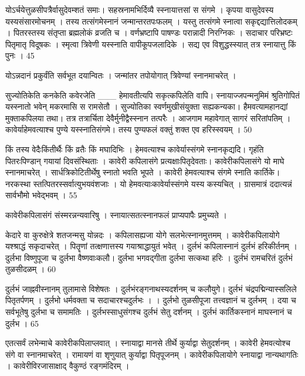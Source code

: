   योऽर्चयेत्तुळसीपत्रैर्वासुदेवम्शतं समाः।
 सहस्रनामभिर्दिव्यै स्स्नायात्तसां स संगमे ।
 कृपया वासुदेवस्य यस्यसंसारमोचनम् ।
 तस्य तत्संगमेस्नानं जन्मान्तरतपःफलम् ।
 यस्तु तत्संगमे स्नात्वा सकृद्दद्यात्तिलोदकम् ।
 पितरस्तस्य संतृप्ता ब्रह्मलोकं व्रजति च ।
 वर्णभ्रष्टापि पाषण्डः परान्नादी निरग्निकः ।
 सदाचार परिभ्रष्टः पितृमातृ विदूषकः ।
 स्मृत्वा त्रिवेणी यस्स्नाति वापीकूपजलादिके ।
 सद्य एव विशुद्धस्स्यात् तत्र स्नायात्तु किं पुनः ।
 45

  योऽन्नदानं प्रकुर्वंति सर्वभूत दयान्वितः ।
 जन्मांतर तपोयोगात् त्रिवेण्यां स्नानमाचरेत् ।
 
सुज्योतिकेति कनकेति कवेरजेति
___ हेमावतीत्यपि सकृत्कपिलेति वापि।
 स्नायाज्जपन्मनुमिमं श्रुतिगोपितं
यस्स्नातो भवेन् मकरमासि स रामसेतौ ।
 सुज्योतिका स्वर्णमुखीसंयुक्ता सह्यकन्यका।
 हैमवत्यामहानद्यां मुक्ताकपिलया तथा।
 तत्र तत्रार्चिता देवैर्मुनीद्वैस्स्नान तत्परैः ।
 आजगाम महावेगात् सागरं सरितांपतिम् ।
 कावेर्याहेमवत्याश्च पुण्ये यस्स्नातिसंगमे।
 तस्य पुण्यफलं वक्तुं शक्त एव हरिस्स्वयम् ।
 50

  किं तस्य वेदैःकिंतीर्थैः किं व्रतैः किं मघादिभिः ।
 हेमवत्याश्च कावेर्यास्संगमे स्नानकृद्यदि।
 गृहंति पितरःपिण्डान् गयायां दिवसंस्थिताः ।
 कावेरी कपिलासंगे प्रत्यक्षाःपितृदेवताः।
 कावेरीकपिलासंगे यो माघे स्नानमाचरेत् ।
 सार्धत्रिकोटितीर्थेषु स्नातो भवति भूपते ।
 कावेरी हेमवत्याश्च संगमे स्नाति कार्तिके।
 नरकस्था स्तत्पितरस्सर्वात्युभयवंशजाः ।
 यो हेमवत्याःकावेर्यास्संगमे यस्य कस्यचित् ।
 ग्रासमात्रं ददात्यन्नं सार्वभौमो भवेद्भवम् ।
 55

  कावेरीकपिलासंगं संस्मरन्नन्यवारिषु ।
 स्नायात्सतत्स्नानफलं प्राप्यपापैः प्रमुच्यते ।
 
केदारे वा कुरुक्षेत्रे शतजन्मसु योन्नदः ।
 कपिलासह्यजा योगे सलभेत्स्नानमुत्तमम् ।
 कावेरीकपिलायोगे यश्श्राद्धं सकृदाचरेत् ।
 पितॄणां तत्क्षणात्तस्य गयाश्राद्धायुतं भवेत् ।
 दुर्लभं कपिलास्नानं दुर्लभं हरिकीर्तनम् ।
 दुर्लभा विष्णुपूजा च दुर्लभा वैष्णवाःकलौ।
 दुर्लभा भगवद्गीता दुर्लभा सत्कथा हरिः ।
 दुर्लभं रामचरितं दुर्लभं तुळसीदळम् ।
 60

  दुर्लभं जाह्नवीस्नानम् तुलामासे विशेषतः ।
 दुर्लभंरङ्गनाथस्यदर्शनम् च कलौयुगे।
 दुर्लभं चंद्रपद्मिन्यास्सलिले पितृतर्पणम् ।
 दुर्लभो धर्मवक्ता च सदाचारश्चदुर्लभः ।
 ।
 दुर्लभो तुळसीपूजा तत्त्वज्ञानं च दुर्लभम् ।
 दया च सर्वभूतेषु दुर्लभा च समामतिः ।
 दुर्लभस्साधुसंगश्च दुर्लभं सेतु दर्शनम् ।
 दुर्लभं कार्तिकस्नानं माघस्नानं च दुर्लभ ।
 65

  एतत्सर्वं लभेन्माचे कावेरीकपिलाप्लवात् ।
 स्नायाद्वा मानसे तीर्थे कुर्याद्वा सेतुदर्शनम् ।
 कावेरी हेमवत्योश्च संगे वा स्नानमाचरेत् ।
 रामायणं वा शृणुयात् कुर्याद्वा पितृपूजनम् ।
 कावेरीकपिलायोगे स्नायाद्वा नान्यथागतिः ।
 कावेरीविरजासाक्षाद् वैकुण्ठं रङ्गमंदिरम् ।
 
